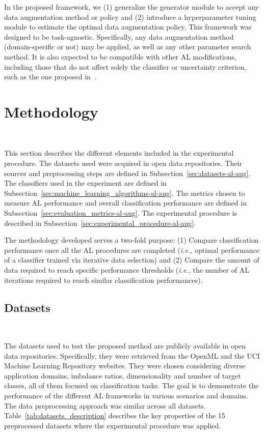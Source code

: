 In the proposed framework, we (1) generalize the generator module to accept
any data augmentation method or policy and (2) introduce a hyperparameter
tuning module to estimate the optimal data augmentation policy. This framework
was designed to be task-agnostic. Specifically, any data augmentation method
(domain-specific or not) may be applied, as well as any other parameter search
method. It is also expected to be compatible with other AL modifications,
including those that do not affect solely the classifier or uncertainty
criterion, such as the one proposed in~\cite{Yoo2019}.
 
\section{Methodology}~\label{sec:methodology-al-aug}

This section describes the different elements included in the experimental
procedure. The datasets used were acquired in open data repositories. Their
sources and preprocessing steps are defined in
Subsection~\ref{sec:datasets-al-aug}.
The classifiers used in the experiment are defined in
Subsection~\ref{sec:machine_learning_algorithms-al-aug}. The metrics chosen to
measure AL performance and overall classification performance are defined in
Subsection~\ref{sec:evaluation_metrics-al-aug}. The experimental procedure is
described in Subsection~\ref{sec:experimental_procedure-al-aug}.

The methodology developed serves a two-fold purpose: (1) Compare
classification performance once all the AL procedures are completed
(\textit{i.e.,} optimal performance of a classifier trained via iterative data
selection) and (2) Compare the amount of data required to reach specific
performance thresholds (\textit{i.e.,} the number of AL iterations required to
reach similar classification performances).
 
\subsection{Datasets}~\label{sec:datasets-al-aug}

The datasets used to test the proposed method are publicly available in open
data repositories. Specifically, they were retrieved from the OpenML and the
UCI Machine Learning Repository websites. They were chosen considering diverse
application domains, imbalance ratios, dimensionality and number of target
classes, all of them focused on classification tasks. The goal is to
demonstrate the performance of the different AL frameworks in various
scenarios and domains. The data preprocessing approach was similar across all
datasets.  Table~\ref{tab:datasets_description} describes the key properties
of the 15 preprocessed datasets where the experimental procedure was applied. 
 
